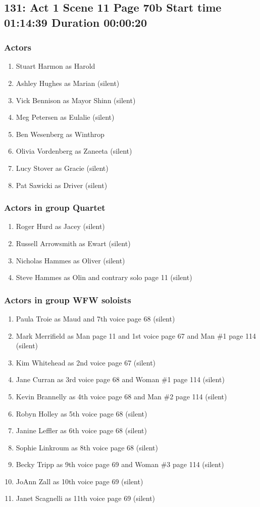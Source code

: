 \subsection{131: Act 1 Scene 11 Page 70b Start time 01:14:39 Duration 00:00:20}

\subsubsection{Actors}
\begin{enumerate}
\item Stuart Harmon as Harold
\item Ashley Hughes as Marian (silent)
\item Vick Bennison as Mayor Shinn (silent)
\item Meg Petersen as Eulalie (silent)
\item Ben Wesenberg as Winthrop
\item Olivia Vordenberg as Zaneeta (silent)
\item Lucy Stover as Gracie (silent)
\item Pat Sawicki as Driver (silent)
\end{enumerate}
\subsubsection{Actors in group Quartet}
\begin{enumerate}
\item Roger Hurd as Jacey (silent)
\item Russell Arrowsmith as Ewart (silent)
\item Nicholas Hammes as Oliver (silent)
\item Steve Hammes as Olin and contrary solo page 11 (silent)
\end{enumerate}
\subsubsection{Actors in group WFW soloists}
\begin{enumerate}
\item Paula Troie as Maud and 7th voice page 68 (silent)
\item Mark Merrifield as Man page 11 and 1st voice page 67 and Man \#1 page 114 (silent)
\item Kim Whitehead as 2nd voice page 67 (silent)
\item Jane Curran as 3rd voice page 68 and Woman \#1 page 114 (silent)
\item Kevin Brannelly as 4th voice page 68 and Man \#2 page 114 (silent)
\item Robyn Holley as 5th voice page 68 (silent)
\item Janine Leffler as 6th voice page 68 (silent)
\item Sophie Linkroum as 8th voice page 68 (silent)
\item Becky Tripp as 9th voice page 69 and Woman \#3 page 114 (silent)
\item JoAnn Zall as 10th voice page 69 (silent)
\item Janet Scagnelli as 11th voice page 69 (silent)
\end{enumerate}

